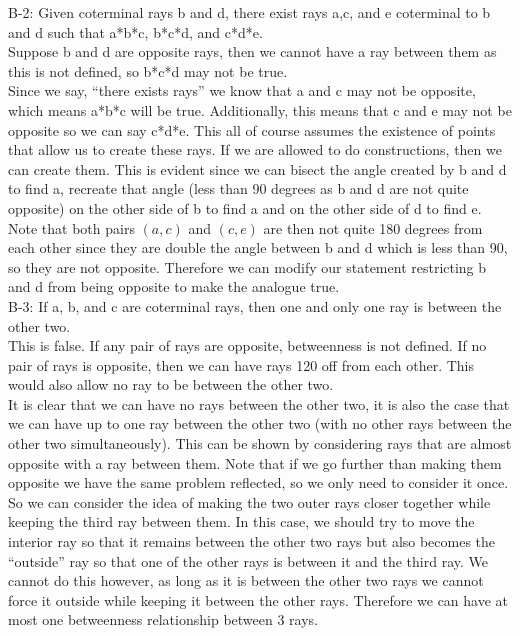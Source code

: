 \documentclass[12pt,letterpaper]{article}
\begin{document}
B-2: Given coterminal rays b and d, there exist rays a,c, and e coterminal to b and d such that a*b*c, b*c*d, and c*d*e.\\

Suppose b and d are opposite rays, then we cannot have a ray between them as this is not defined, so b*c*d may not be true.  \\

Since we say, ``there exists rays'' we know that a and c may not be opposite, which means a*b*c will be true.  Additionally, this means that c and e may not be opposite so we can say c*d*e.  This all of course assumes the existence of points that allow us to create these rays.  If we are allowed to do constructions, then we can create them. This is evident since we can bisect the angle created by b and d to find a, recreate that angle (less than 90 degrees as b and d are not quite opposite) on the other side of b to find a and on the other side of d to find e.  Note that both pairs $(a,c)$ and $(c,e)$ are then not quite 180 degrees from each other since they are double the angle between b and d which is less than 90, so they are not opposite.  Therefore we can modify our statement restricting b and d from being opposite to make the analogue true.\\




B-3: If a, b, and c are coterminal rays, then one and only one ray is between the other two.\\

This is false.  If any pair of rays are opposite, betweenness is not defined. If no pair of rays is opposite, then we can have rays 120 off from each other.  This would also allow no ray to be between the other two. \\ 

It is clear that we can have no rays between the other two, it is also the case that we can have up to one ray between the other two (with no other rays between the other two simultaneously).  This can be shown by considering rays that are almost opposite with a ray between them.  Note that if we go further than making them opposite we have the same problem reflected, so we only need to consider it once.  So we can consider the idea of making the two outer rays closer together while keeping the third ray between them.  In this case, we should try to move the interior ray so that it remains between the other two rays but also becomes the ``outside'' ray so that one of the other rays is between it and the third ray.  We cannot do this however, as long as it is between the other two rays we cannot force it outside while keeping it between the other rays.  Therefore we can have at most one betweenness relationship between 3 rays.\\
\end{document}
